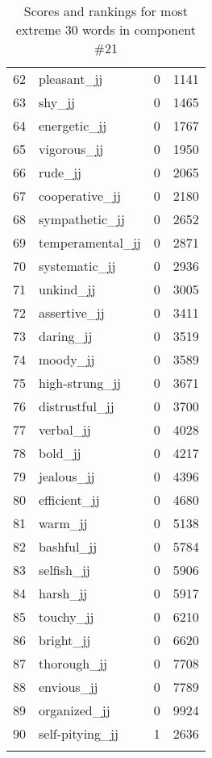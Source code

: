 \begin{longtable}[!htbp]{| rlr@{.}l |}
    62 & pleasant\_jj & 0 & 1141 \\
    63 & shy\_jj & 0 & 1465 \\
    64 & energetic\_jj & 0 & 1767 \\
    65 & vigorous\_jj & 0 & 1950 \\
    66 & rude\_jj & 0 & 2065 \\
    67 & cooperative\_jj & 0 & 2180 \\
    68 & sympathetic\_jj & 0 & 2652 \\
    69 & temperamental\_jj & 0 & 2871 \\
    70 & systematic\_jj & 0 & 2936 \\
    71 & unkind\_jj & 0 & 3005 \\
    72 & assertive\_jj & 0 & 3411 \\
    73 & daring\_jj & 0 & 3519 \\
    74 & moody\_jj & 0 & 3589 \\
    75 & high-strung\_jj & 0 & 3671 \\
    76 & distrustful\_jj & 0 & 3700 \\
    77 & verbal\_jj & 0 & 4028 \\
    78 & bold\_jj & 0 & 4217 \\
    79 & jealous\_jj & 0 & 4396 \\
    80 & efficient\_jj & 0 & 4680 \\
    81 & warm\_jj & 0 & 5138 \\
    82 & bashful\_jj & 0 & 5784 \\
    83 & selfish\_jj & 0 & 5906 \\
    84 & harsh\_jj & 0 & 5917 \\
    85 & touchy\_jj & 0 & 6210 \\
    86 & bright\_jj & 0 & 6620 \\
    87 & thorough\_jj & 0 & 7708 \\
    88 & envious\_jj & 0 & 7789 \\
    89 & organized\_jj & 0 & 9924 \\
    90 & self-pitying\_jj & 1 & 2636 \\
    \hline
    \caption{Scores and rankings for most extreme 30 words in component \#21} \\
\end{longtable}
